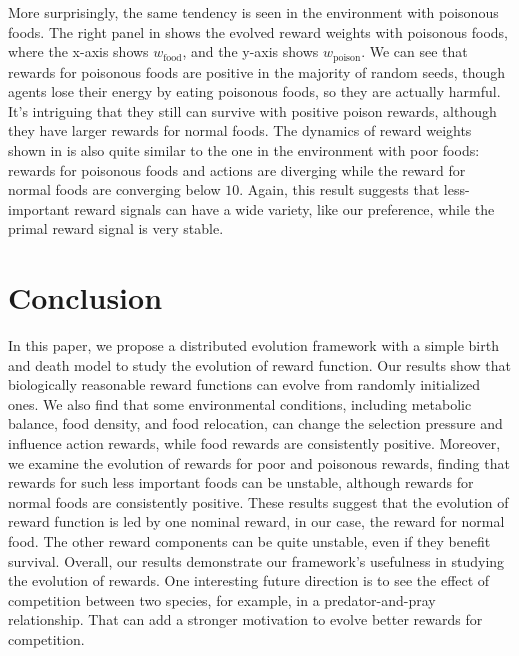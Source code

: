 More surprisingly, the same tendency is seen in the environment with poisonous foods. The right panel in  shows the evolved reward weights with poisonous foods, where the x-axis shows $w_{\mathrm{food}}$, and the y-axis shows $w_{\mathrm{poison}}$. We can see that rewards for poisonous foods are positive in the majority of random seeds, though agents lose their energy by eating poisonous foods, so they are actually harmful. It's intriguing that they still can survive with positive poison rewards, although they have larger rewards for normal foods. The dynamics of reward weights shown in  is also quite similar to the one in the environment with poor foods: rewards for poisonous foods and actions are diverging while the reward for normal foods are converging below $10$. Again, this result suggests that less-important reward signals can have a wide variety, like our preference, while the primal reward signal is very stable.

\section{Conclusion}
In this paper, we propose a distributed evolution framework with a simple birth and death model to study the evolution of reward function. Our results show that biologically reasonable reward functions can evolve from randomly initialized ones. We also find that some environmental conditions, including metabolic balance, food density, and food relocation, can change the selection pressure and influence action rewards, while food rewards are consistently positive. Moreover, we examine the evolution of rewards for poor and poisonous rewards, finding that rewards for such less important foods can be unstable, although rewards for normal foods are consistently positive. These results suggest that the evolution of reward function is led by one nominal reward, in our case, the reward for normal food. The other reward components can be quite unstable, even if they benefit survival. Overall, our results demonstrate our framework's usefulness in studying the evolution of rewards. One interesting future direction is to see the effect of competition between two species, for example, in a predator-and-pray relationship. That can add a stronger motivation to evolve better rewards for competition.
